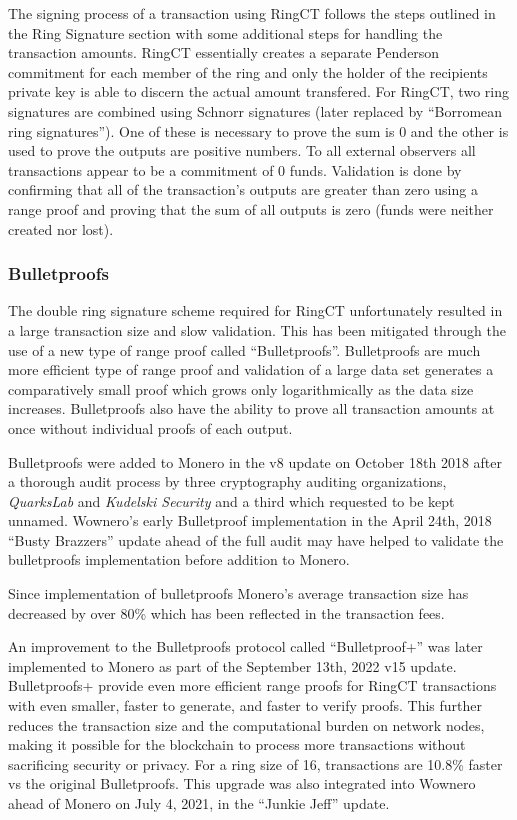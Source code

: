 The signing process of a transaction using RingCT follows the steps outlined in the Ring Signature section with some additional steps for handling the transaction amounts. RingCT essentially creates a separate Penderson commitment for each member of the ring and only the holder of the recipients private key is able to discern the actual amount transfered\cite{ringct_whitepaper}. For RingCT, two ring signatures are combined using Schnorr signatures\cite{schnorr_sig} (later replaced by ``Borromean ring signatures''). One of these is necessary to prove the sum is 0 and the other is used to prove the outputs are positive numbers\cite{moneropedia}. To all external observers all transactions appear to be a commitment of 0 funds. Validation is done by confirming that all of the transaction's outputs are greater than zero using a range proof and proving that the sum of all outputs is zero (funds were neither created nor lost)\cite{ringct_whitepaper}.


\subsubsection{Bulletproofs}
The double ring signature scheme required for RingCT unfortunately resulted in a large transaction size and slow validation. This has been mitigated through the use of a new type of range proof called ``Bulletproofs''\cite{bulletproofs_whitepaper}. Bulletproofs are much more efficient type of range proof and validation of a large data set generates a comparatively  small proof which grows only logarithmically as the data size increases. Bulletproofs also have the ability to prove all transaction amounts at once without individual proofs of each output\cite{moneropedia}. 

Bulletproofs were added to Monero in the v8 update on October 18th 2018\cite{monero_repo} after a thorough audit process by three cryptography auditing organizations, \emph{QuarksLab} and  \emph{Kudelski Security} and a third which requested to be kept unnamed\cite{moneropedia}. Wownero's early Bulletproof implementation in the April 24th, 2018 ``Busty Brazzers'' update\cite{wowrepo} ahead of the full audit may have helped to validate the bulletproofs implementation before addition to Monero.

Since implementation of bulletproofs Monero's average transaction size has decreased by over 80\% which has been reflected in the transaction fees\cite{moneropedia}.

An improvement to the Bulletproofs protocol called ``Bulletproof+'' was later implemented to Monero as part of the September 13th, 2022 v15 update\cite{monero_repo}. Bulletproofs+ provide even more efficient range proofs for RingCT transactions with even smaller, faster to generate, and faster to verify proofs\cite{bulletproofs+}. This further reduces the transaction size and the computational burden on network nodes, making it possible for the blockchain to process more transactions without sacrificing security or privacy. For a ring size of 16, transactions are 10.8\% faster vs the original Bulletproofs\cite{bulletproofs+}. This upgrade was also integrated into Wownero ahead of Monero on July 4, 2021, in the ``Junkie Jeff'' update.


